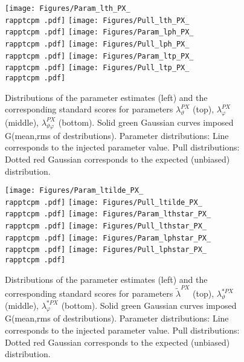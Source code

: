 \documentclass[12pt]{article}
\newcommand{\lamthPX}{\lambda^{\scriptscriptstyle PX}_\vartheta}
\newcommand{\lamphPX}{\lambda^{\scriptscriptstyle PX}_\varphi}
\newcommand{\lamthphPX}{\lambda^{\scriptscriptstyle PX}_{\vartheta \varphi}}
\newcommand{\lamtildePX}{\tilde{\lambda}^{\scriptscriptstyle PX}}
\newcommand{\lamthstarPX}{\lambda^{* \scriptscriptstyle PX}_\vartheta}
\newcommand{\lamphstarPX}{\lambda^{* \scriptscriptstyle PX}_\varphi}
\providecommand{\rapptcpm}[1]{rap1pt1cpm1}%
\begin{document}
\begin{figure}[htbp]
\centering
\texttt{[image: Figures/Param\_lth\_PX\_\\rapptcpm .pdf]}
\texttt{[image: Figures/Pull\_lth\_PX\_\\rapptcpm .pdf]}
\texttt{[image: Figures/Param\_lph\_PX\_\\rapptcpm .pdf]}
\texttt{[image: Figures/Pull\_lph\_PX\_\\rapptcpm .pdf]}
\texttt{[image: Figures/Param\_ltp\_PX\_\\rapptcpm .pdf]}
\texttt{[image: Figures/Pull\_ltp\_PX\_\\rapptcpm .pdf]}
\caption{Distributions of the parameter estimates (left) and the corresponding
standard scores for parameters $\lamthPX$ (top), $\lamphPX$ (middle),
$\lamthphPX$ (bottom). Solid green Gaussian curves imposed G(mean,rms of
destributions). Parameter distributions: Line corresponds to the injected parameter value.
Pull distributions: Dotted red Gaussian corresponds to the expected
(unbiased) distribution.}
\end{figure}
\clearpage

\begin{figure}[htbp]
\centering
\texttt{[image: Figures/Param\_ltilde\_PX\_\\rapptcpm .pdf]}
\texttt{[image: Figures/Pull\_ltilde\_PX\_\\rapptcpm .pdf]}
\texttt{[image: Figures/Param\_lthstar\_PX\_\\rapptcpm .pdf]}
\texttt{[image: Figures/Pull\_lthstar\_PX\_\\rapptcpm .pdf]}
\texttt{[image: Figures/Param\_lphstar\_PX\_\\rapptcpm .pdf]}
\texttt{[image: Figures/Pull\_lphstar\_PX\_\\rapptcpm .pdf]}
\caption{Distributions of the parameter estimates (left) and the corresponding
standard scores for parameters $\lamtildePX$ (top), $\lamthstarPX$ (middle),
$\lamphstarPX$ (bottom). Solid green Gaussian curves imposed G(mean,rms of
destributions). Parameter distributions: Line corresponds to the injected parameter value.
Pull distributions: Dotted red Gaussian corresponds to the expected
(unbiased) distribution.}
\end{figure}
\clearpage
\end{document}
